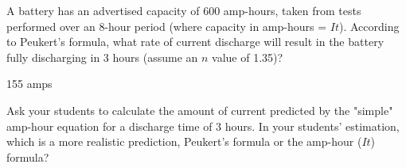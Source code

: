 

A battery has an advertised capacity of 600 amp-hours, taken from tests performed over an 8-hour period (where capacity in amp-hours = $It$).  According to Peukert's formula, what rate of current discharge will result in the battery fully discharging in 3 hours (assume an $n$ value of 1.35)?







155 amps







Ask your students to calculate the amount of current predicted by the "simple" amp-hour equation for a discharge time of 3 hours.  In your students' estimation, which is a more realistic prediction, Peukert's formula or the amp-hour ($It$) formula?




